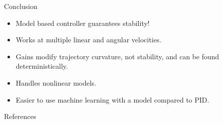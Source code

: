 \documentclass[hyperref={pdfpagelabels=false}]{beamer}
\begin{document}
\begin{frame}{Conclusion}
\begin{itemize}
\item Model based controller guarantees stability!
\item Works at multiple linear and angular velocities.
\item Gains modify trajectory curvature, not stability, and can be found deterministically.
\item Handles nonlinear models.
\item Easier to use machine learning with a model compared to PID.
\end{itemize}
\end{frame}

\begin{frame}[allowframebreaks]{References}
\nocite{Khalil02}
\nocite{Rusu05RobotuxLyapunov}
\nocite{Aicardi_UnicycleLyapunov95}
\nocite{Lapierre07}
\nocite{Sights07}
\nocite{ZeiglerNichols42}


\end{frame}
\end{document}

